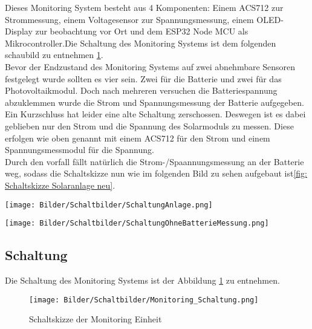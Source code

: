 \documentclass[ngerman]{mucproc}
\begin{document}
Dieses Monitoring System besteht aus 4 Komponenten: Einem ACS712 zur Strommessung, einem Voltagesensor zur Spannungsmessung, einem OLED-Display zur beobachtung vor Ort und dem ESP32 Node MCU als Mikrocontroller.Die Schaltung des Monitoring Systems ist dem folgenden schaubild zu entnehmen \ref{fig:Monitoring Einheit}.
\\		
		Bevor der Endzustand des Monitoring Systems auf zwei abnehmbare Sensoren festgelegt wurde sollten es vier sein. Zwei für die Batterie und zwei für das Photovoltaikmodul. Doch nach mehreren versuchen die Batteriespannung abzuklemmen wurde die Strom und Spannungsmessung der Batterie aufgegeben. Ein Kurzschluss hat leider eine alte Schaltung zerschossen. Deswegen ist es dabei geblieben nur den Strom und die Spannung des Solarmoduls zu messen. Diese erfolgen wie oben genannt mit einem ACS712 für den Strom und einem Spannungsmessmodul für die Spannung.
\\
Durch den vorfall fällt natürlich die Strom-/Spaannungsmessung an der Batterie weg, sodass die Schaltskizze nun wie im folgenden Bild zu sehen aufgebaut ist\ref{fig: Schaltskizze Solaranlage neu}.

\begin{figure*}
    \begin{center}
    \texttt{[image: Bilder/Schaltbilder/SchaltungAnlage.png]}
    \caption{Schaltskizze der Solaranlage mit Batteriemessung}
      \label{fig: Schaltskizze Solaranlage alt}
    \end{center}
    \end{figure*}


    \begin{figure*}
    \begin{center}
    \texttt{[image: Bilder/Schaltbilder/SchaltungOhneBatterieMessung.png]}
    \caption{Schaltskizze der Solaranlage ohne Batteriemessung}
		\label{fig: Schaltskizze Solaranlage neu}
    \end{center}
    \end{figure*}
\newpage
\subsection{Schaltung}
Die Schaltung des Monitoring Systems ist der Abbildung \ref{fig:Monitoring Einheit} zu entnehmen.

		\begin{figure}
			\centering
			\texttt{[image: Bilder/Schaltbilder/Monitoring\_Schaltung.png]}
			\caption{Schaltskizze der Monitoring Einheit}
			\label{fig:Monitoring Einheit}
		\end{figure}
		
\end{document}
